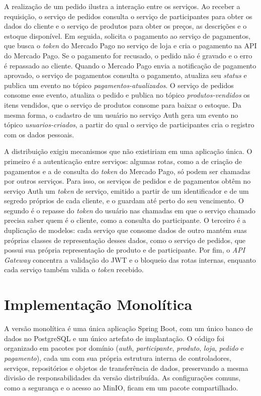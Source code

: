 A realização de um pedido ilustra a interação entre os serviços. Ao receber a requisição, o
serviço de pedidos consulta o serviço de participantes para obter os dados do cliente e o
serviço de produtos para obter os preços, as descrições e o estoque disponível. Em seguida,
solicita o pagamento ao serviço de pagamentos, que busca o \textit{token} do Mercado Pago no
serviço de loja e cria o pagamento na API do Mercado Pago. Se o pagamento for recusado, o pedido
não é gravado e o erro é repassado ao cliente. Quando o Mercado Pago envia a notificação de
pagamento aprovado, o serviço de pagamentos consulta o pagamento, atualiza seu \textit{status} e
publica um evento no tópico \textit{pagamentos-atualizados}. O serviço de pedidos consome esse
evento, atualiza o pedido e publica no tópico \textit{produtos-vendidos} os itens vendidos, que
o serviço de produtos consome para baixar o estoque. Da mesma forma, o cadastro de um usuário no
serviço Auth gera um evento no tópico \textit{usuarios-criados}, a partir do qual o serviço de
participantes cria o registro com os dados pessoais.

A distribuição exigiu mecanismos que não existiriam em uma aplicação única. O primeiro é a
autenticação entre serviços: algumas rotas, como a de criação de pagamentos e a de consulta do
\textit{token} do Mercado Pago, só podem ser chamadas por outros serviços. Para isso, os serviços
de pedidos e de pagamentos obtêm no serviço Auth um \textit{token} de serviço, emitido a partir
de um identificador e de um segredo próprios de cada cliente, e o guardam até perto do seu
vencimento. O segundo é o repasse do \textit{token} do usuário nas chamadas em que o serviço
chamado precisa saber quem é o cliente, como a consulta do participante. O terceiro é a
duplicação de modelos: cada serviço que consome dados de outro mantém suas próprias classes de
representação desses dados, como o serviço de pedidos, que possui sua própria representação de
produto e de participante. Por fim, o \textit{API Gateway} concentra a validação do JWT e o
bloqueio das rotas internas, enquanto cada serviço também valida o \textit{token} recebido.

\section{Implementação Monolítica}

A versão monolítica é uma única aplicação Spring Boot, com um único banco de dados no PostgreSQL
e um único artefato de implantação. O código foi organizado em pacotes por domínio
(\textit{auth}, \textit{participante}, \textit{produto}, \textit{loja}, \textit{pedido} e
\textit{pagamento}), cada um com sua própria estrutura interna de controladores, serviços,
repositórios e objetos de transferência de dados, preservando a mesma divisão de
responsabilidades da versão distribuída. As configurações comuns, como a segurança e o acesso ao
MinIO, ficam em um pacote compartilhado.

